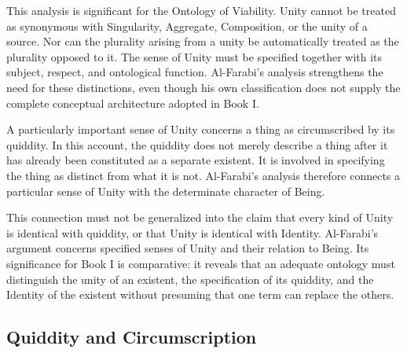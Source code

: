 \label{para:VS.B01.P01.C08.S12.SS05.P004}

This analysis is significant for the
Ontology of Viability. Unity cannot
be treated as synonymous with
Singularity, Aggregate, Composition,
or the unity of a source. Nor can
the plurality arising from a unity
be automatically treated as the
plurality opposed to it. The sense
of Unity must be specified together
with its subject, respect, and
ontological function. Al-Farabi's
analysis strengthens the need for
these distinctions, even though
his own classification does not
supply the complete conceptual
architecture adopted in Book I.

\label{para:VS.B01.P01.C08.S12.SS05.P005}

A particularly important sense of
Unity concerns a thing as circumscribed
by its quiddity. In this account,
the quiddity does not merely describe
a thing after it has already been
constituted as a separate existent.
It is involved in specifying the
thing as distinct from what it is not.
Al-Farabi's analysis therefore connects
a particular sense of Unity with
the determinate character of Being.
\citep[sec.~3.6]{MennAlFarabiMetaphysicsSEP2026}

\label{para:VS.B01.P01.C08.S12.SS05.P006}

This connection must not be generalized
into the claim that every kind of
Unity is identical with quiddity,
or that Unity is identical with
Identity. Al-Farabi's argument concerns
specified senses of Unity and their
relation to Being. Its significance
for Book I is comparative: it reveals
that an adequate ontology must
distinguish the unity of an existent,
the specification of its quiddity,
and the Identity of the existent
without presuming that one term
can replace the others.



\subsection{Quiddity and Circumscription}
\label{subsec:ch08-farabi-quiddity}

\label{para:VS.B01.P01.C08.S12.SS06.P001}

